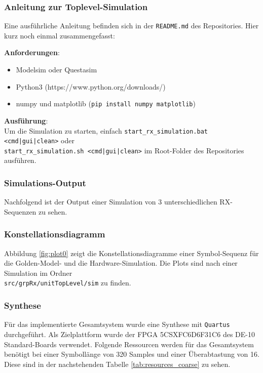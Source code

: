 \subsubsection{Anleitung zur Toplevel-Simulation}
Eine ausführliche Anleitung befinden sich in der \texttt{README.md} des Repositories. Hier kurz noch einmal zusammengefasst:

\vspace{5pt}
\noindent
\textbf{Anforderungen}:
\begin{itemize}
\item Modelsim oder Questasim
\item Python3 (https://www.python.org/downloads/)
\item numpy und matplotlib (\texttt{pip install numpy matplotlib})
\end{itemize}

\vspace{5pt}
\noindent
\textbf{Ausführung}:\\
Um die Simulation zu starten, einfach \texttt{start\_rx\_simulation.bat <cmd|gui|clean>} oder\\ \texttt{start\_rx\_simulation.sh <cmd|gui|clean>} im Root-Folder des Repositories ausführen.

\subsubsection{Simulations-Output}
Nachfolgend ist der Output einer Simulation von 3 unterschiedlichen RX-Sequenzen zu sehen.

\subsubsection{Konstellationsdiagramm}
Abbildung \ref{fig:plot0} zeigt die Konstellationsdiagramme einer Symbol-Sequenz für die Golden-Model- und die Hardware-Simulation. Die Plots sind nach einer Simulation im Ordner\\ \texttt{src/grpRx/unitTopLevel/sim} zu finden.

\subsubsection{Synthese}
Für das implementierte Gesamtsystem wurde eine Synthese mit \texttt{Quartus} durchgeführt. Als Zielplattform wurde der FPGA 5CSXFC6D6F31C6 des DE-10 Standard-Boards verwendet. Folgende Ressourcen werden für das Gesamtsystem benötigt bei einer Symbollänge von 320 Samples und einer Überabtastung von 16.
Diese sind in der nachstehenden Tabelle \ref{tab:resources_coarse} zu sehen.

